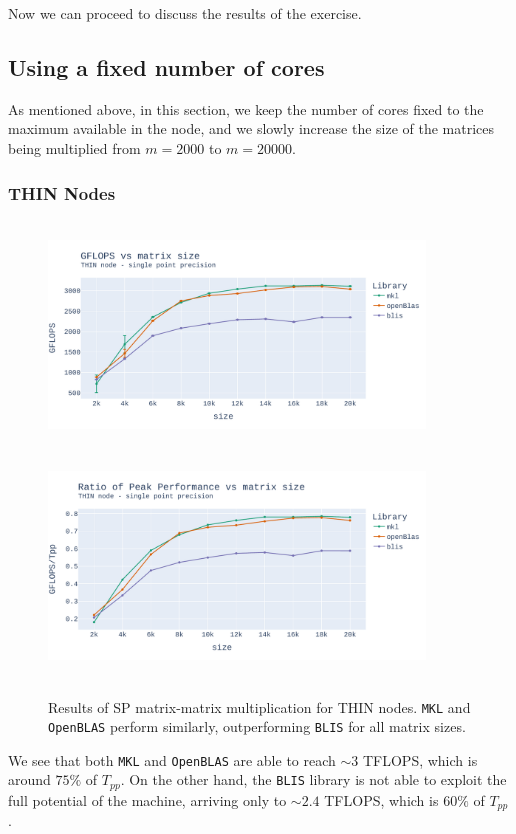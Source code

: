 \documentclass{report}
\begin{document}
Now we can proceed to discuss the results of the exercise.

\subsection{Using a fixed number of cores}

As mentioned above, in this section, we keep the number of cores fixed to the 
maximum available in the node, and we slowly increase the size of the matrices 
being multiplied from $m=2000$ to $m=20000$. 

\subsubsection{THIN Nodes}

\begin{figure}[h!]
\hspace*{-3.0cm}
\includegraphics[width=10cm, height=6cm]{./images/fixed_cores_thin_float_gflops.pdf}
\includegraphics[width=10cm, height=6cm]{./images/fixed_cores_thin_float_gflops_ratio.pdf}
\caption{\label{fig:fixed_cores_thin_float} Results of SP matrix-matrix multiplication 
for THIN nodes. \texttt{MKL} and \texttt{OpenBLAS} perform similarly, outperforming 
\texttt{BLIS} for all matrix sizes.}
\end{figure}
We see that both \texttt{MKL} and 
\texttt{OpenBLAS} are able to reach $\sim 3$ TFLOPS, which is around 
$75\%$ of $T_{pp}$. On the other hand, the \texttt{BLIS} library is not 
able to exploit the full potential of the machine, arriving only to 
$\sim 2.4$ TFLOPS, which is $60\%$ of $T_{pp}$.
\end{document}
